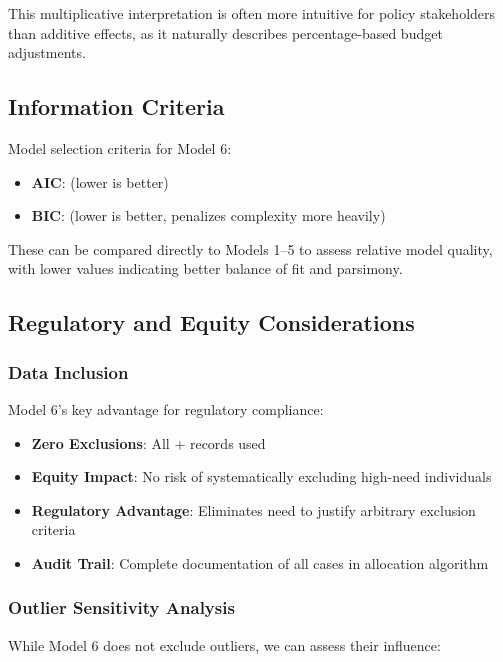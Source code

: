 This multiplicative interpretation is often more intuitive for policy stakeholders than additive effects, as it naturally describes percentage-based budget adjustments.

\subsection{Information Criteria}

Model selection criteria for Model 6:

\begin{itemize}
    \item \textbf{AIC}: \ModelSixAIC{} (lower is better)
    \item \textbf{BIC}: \ModelSixBIC{} (lower is better, penalizes complexity more heavily)
\end{itemize}

These can be compared directly to Models 1--5 to assess relative model quality, with lower values indicating better balance of fit and parsimony.

\subsection{Regulatory and Equity Considerations}

\subsubsection{Data Inclusion}

Model 6's key advantage for regulatory compliance:

\begin{itemize}
    \item \textbf{Zero Exclusions}: All \MTrainingSamples{} + \MTestSamples{} records used
    \item \textbf{Equity Impact}: No risk of systematically excluding high-need individuals
    \item \textbf{Regulatory Advantage}: Eliminates need to justify arbitrary exclusion criteria
    \item \textbf{Audit Trail}: Complete documentation of all cases in allocation algorithm
\end{itemize}

\subsubsection{Outlier Sensitivity Analysis}

While Model 6 does not exclude outliers, we can assess their influence:

